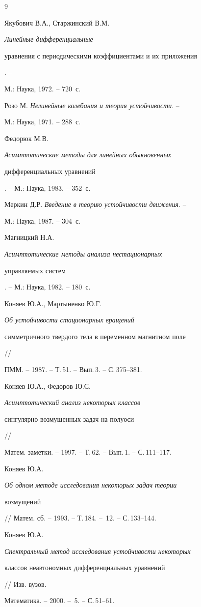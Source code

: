 \begin{thebibliography}{9}







Якубович В.А., Старжинский В.М. {\em Линейные дифференциальные 


уравнения с периодическими коэффициентами и их приложения}. --


М.: Наука, 1972. -- 720~с.




Розо М. {\em Нелинейные колебания и теория устойчивости}. --


М.: Наука, 1971. -- 288~с.




Федорюк М.В. {\em Асимптотические методы для линейных обыкновенных 


дифференциальных уравнений}. -- М.: Наука, 1983. -- 352~с.




Меркин Д.Р. {\em Введение в теорию устойчивости движения}. --


М.: Наука, 1987. -- 304~с.




Магницкий Н.А. {\em Асимптотические методы анализа нестационарных 


управляемых систем}. -- М.: Наука, 1982. -- 180~с.




Коняев Ю.А., Мартыненко Ю.Г. {\em Об устойчивости стационарных вращений 


симметричного твердого тела в переменном магнитном поле} //


ПММ. -- 1987. -- Т.\,51. -- Вып.\,3. -- С.\,375--381.




Коняев Ю.А., Федоров Ю.С. {\em Асимптотический анализ некоторых классов 


сингулярно возмущенных задач на полуоси} //


Матем. заметки. -- 1997. -- Т.\,62. -- Вып.\,1. -- С.\,111--117.




Коняев Ю.А. {\em Об одном методе исследования некоторых задач теории 


возмущений} // Матем. сб. -- 1993. -- Т.\,184. -- \No\,12. -- С.\,133--144.




Коняев Ю.А. {\em Спектральный метод исследования устойчивости некоторых 


классов неавтономных дифференциальных уравнений} // Изв. вузов. 


Математика. -- 2000. -- \No\,5. -- С.\,51--61.





\end{thebibliography}





\vskip 2cm












\label{end}





